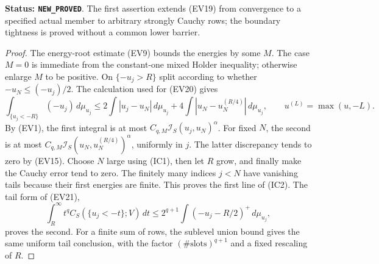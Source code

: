 \documentclass[11pt,a4paper]{article}
\numberwithin{equation}{section}
\theoremstyle{definition}
\theoremstyle{remark}
\begin{document}
\noindent\textbf{Status: \texttt{NEW\_PROVED}}. The first assertion
extends (EV19) from convergence to a specified actual member to
arbitrary strongly Cauchy rows; the boundary tightness is proved
without a common lower barrier.

\begin{proof}
The energy-root estimate (EV9) bounds the energies by some $M$.
The case $M=0$ is immediate from the constant-one mixed Holder
inequality; otherwise enlarge $M$ to be positive. On
$\{-u_j>R\}$ split according to whether
$-u_N\leq(-u_j)/2$. The calculation used for (EV20) gives
\[
 \int_{\{u_j<-R\}}(-u_j)\,d\mu_{u_j}
 \leq 2\int|u_j-u_N|\,d\mu_{u_j}
       +4\int|u_N-u_N^{(R/4)}|\,d\mu_{u_j},
 \qquad u^{(L)}=\max(u,-L).
 \tag{IC4}
\]
By (EV1), the first integral is at most
$C_{q,M}\mathscr I_S(u_j,u_N)^\alpha$.
For fixed $N$, the second is at most
$C_{q,M}\mathscr I_S(u_N,u_N^{(R/4)})^\alpha$, uniformly
in $j$. The latter discrepancy tends to zero by (EV15).
Choose $N$ large using (IC1), then let $R$ grow, and finally
make the Cauchy error tend to zero. The finitely many indices
$j<N$ have vanishing tails because their first energies are
finite. This proves the first line of (IC2). The tail form of
(EV21),
\[
 \int_R^\infty t^q C_S(\{u_j<-t\};V)\,dt
       \leq 2^{q+1}\int(-u_j-R/2)^+\,d\mu_{u_j},
 \tag{IC5}
\]
proves the second. For a finite sum of rows, the sublevel union
bound gives the same uniform tail conclusion, with the factor
$(\#\text{slots})^{q+1}$ and a fixed rescaling of $R$.


\end{proof}
\end{document}
